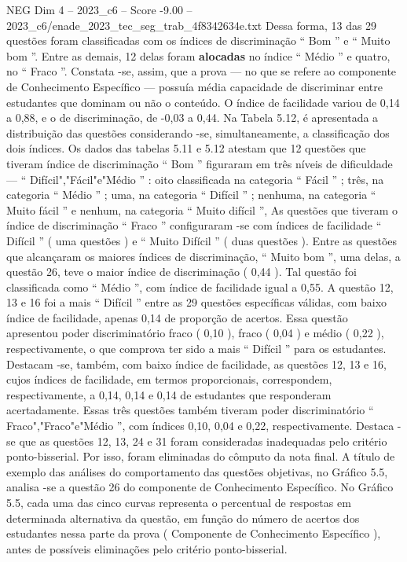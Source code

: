 \begin{textsample}{NEG Dim 4 – 2023\_c6 – Score -9.00 – 2023\_c6/enade\_2023\_tec\_seg\_trab\_4f8342634e.txt}
Dessa forma, 13 das 29 questões foram classificadas com os índices de discriminação “ Bom ” e “ Muito bom ”.
Entre as demais, 12 delas foram \textbf{alocadas} no índice “ Médio ” e quatro, no “ Fraco ”.
Constata -se, assim, que a prova — no que se refere ao componente de Conhecimento Específico — possuía média capacidade de discriminar entre estudantes que dominam ou não o conteúdo.
O índice de facilidade variou de 0,14 a 0,88, e o de discriminação, de -0,03 a 0,44.
Na Tabela 5.12, é apresentada a distribuição das questões considerando -se, simultaneamente, a classificação dos dois índices.
Os dados das tabelas 5.11 e 5.12 atestam que 12 questões que tiveram índice de discriminação “ Bom ” figuraram em três níveis de dificuldade — “ Difícil","Fácil"e"Médio ” : oito classificada na categoria “ Fácil ” ; três, na categoria “ Médio ” ; uma, na categoria “ Difícil ” ; nenhuma, na categoria “ Muito fácil ” e nenhum, na categoria “ Muito difícil ”, As questões que tiveram o índice de discriminação “ Fraco ” configuraram -se com índices de facilidade “ Difícil ” ( uma questões ) e “ Muito Difícil ” ( duas questões ).
Entre as questões que alcançaram os maiores índices de discriminação, “ Muito bom ”, uma delas, a questão 26, teve o maior índice de discriminação ( 0,44 ).
Tal questão foi classificada como “ Médio ”, com índice de facilidade igual a 0,55.
A questão 12, 13 e 16 foi a mais “ Difícil ” entre as 29 questões específicas válidas, com baixo índice de facilidade, apenas 0,14 de proporção de acertos.
Essa questão apresentou poder discriminatório fraco ( 0,10 ), fraco ( 0,04 ) e médio ( 0,22 ), respectivamente, o que comprova ter sido a mais “ Difícil ” para os estudantes.
Destacam -se, também, com baixo índice de facilidade, as questões 12, 13 e 16, cujos índices de facilidade, em termos proporcionais, correspondem, respectivamente, a 0,14, 0,14 e 0,14 de estudantes que responderam acertadamente.
Essas três questões também tiveram poder discriminatório “ Fraco","Fraco"e"Médio ”, com índices 0,10, 0,04 e 0,22, respectivamente.
Destaca -se que as questões 12, 13, 24 e 31 foram consideradas inadequadas pelo critério ponto-bisserial.
Por isso, foram eliminadas do cômputo da nota final.
A título de exemplo das análises do comportamento das questões objetivas, no Gráfico 5.5, analisa -se a questão 26 do componente de Conhecimento Específico.
No Gráfico 5.5, cada uma das cinco curvas representa o percentual de respostas em determinada alternativa da questão, em função do número de acertos dos estudantes nessa parte da prova ( Componente de Conhecimento Específico ), antes de possíveis eliminações pelo critério ponto-bisserial.

\end{textsample}
